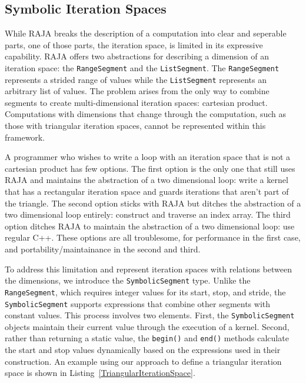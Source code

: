 \documentclass[sigconf,review=true]{acmart}
\begin{document}
\subsection{Symbolic Iteration Spaces}
\label{sec:SymbolicSegment}
While RAJA breaks the description of a computation into clear and seperable parts, one of those parts, the iteration space, is limited in its expressive capability.
RAJA offers two abstractions for describing a dimension of an iteration space: the \verb.RangeSegment. and the \verb.ListSegment..
The \verb.RangeSegment. represents a strided range of values while the \verb.ListSegment. represents an arbitrary list of values.
The problem arises from the only way to combine segments to create multi-dimensional iteration spaces: cartesian product.
Computations with dimensions that change through the computation, such as those with triangular iteration spaces, cannot be represented within this framework.

A programmer who wishes to write a loop with an iteration space that is not a cartesian product has few options.
The first option is the only one that still uses RAJA and maintains the abstraction of a two dimensional loop: write a kernel that has a rectangular iteration space and guards iterations that aren't part of the triangle.
The second option sticks with RAJA but ditches the abstraction of a two dimensional loop entirely: construct and traverse an index array.
The third option ditches RAJA to maintain the abstraction of a two dimensional loop: use regular C++.
These options are all troublesome, for performance in the first case, and portability/maintainance in the second and third. 

To address this limitation and represent iteration spaces with relations between the dimensions, we introduce the \verb.SymbolicSegment. type. 
Unlike the \verb.RangeSegment., which requires integer values for its start, stop, and stride, the \verb.SymbolicSegment. supports expressions that combine other segments with constant values. 
This process involves two elements.
First, the \verb.SymbolicSegment. objects maintain their current value through the execution of a kernel. 
Second, rather than returning a static value, the \verb.begin(). and \verb.end(). methods calculate the start and stop values dynamically based on the expressions used in their construction. 
An example using our approach to define a triangular iteration space is shown in Listing~\ref{TriangularIterationSpace}.

\end{document}
